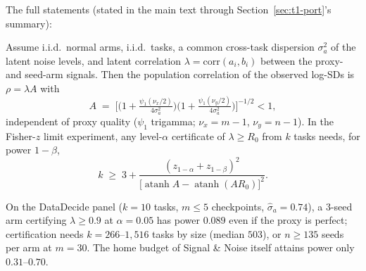 The full statements (stated in the main text through Section~\ref{sec:t1-port}'s summary):

\begin{proposition}
\label{prop:t1-bound}
Assume i.i.d.\ normal arms, i.i.d.\ tasks, a common cross-task dispersion $\sigma_a^2$ of the latent
noise levels, and latent correlation $\lambda = \mathrm{corr}(a_i, b_i)$ between the proxy- and
seed-arm signals. Then the population correlation of the observed log-SDs is $\rho = \lambda A$
with
\[
A \;=\; \bigl[\bigl(1 + \tfrac{\psi_1(\nu_x/2)}{4\sigma_a^2}\bigr)
              \bigl(1 + \tfrac{\psi_1(\nu_y/2)}{4\sigma_a^2}\bigr)\bigr]^{-1/2} < 1 ,
\]
independent of proxy quality ($\psi_1$ trigamma; $\nu_x = m{-}1$, $\nu_y = n{-}1$). In the
Fisher-$z$ limit experiment, any level-$\alpha$ certificate of $\lambda \ge R_0$ from $k$ tasks
needs, for power $1-\beta$,
\[
k \;\ge\; 3 + \frac{(z_{1-\alpha} + z_{1-\beta})^2}
                   {\bigl[\operatorname{atanh} A - \operatorname{atanh}(A R_0)\bigr]^2}.
\]
\end{proposition}

\begin{corollary}
\label{cor:t1-n3}
On the DataDecide panel ($k = 10$ tasks, $m \le 5$ checkpoints, $\hat\sigma_a = 0.74$), a 3-seed
arm certifying $\lambda \ge 0.9$ at $\alpha = 0.05$ has power $0.089$ even if the proxy is
perfect; certification needs $k = 266$--$1{,}516$ tasks by size (median $503$), or $n \ge 135$
seeds per arm at $m = 30$. The home budget of Signal \& Noise itself attains power only
$0.31$--$0.70$.
\end{corollary}

